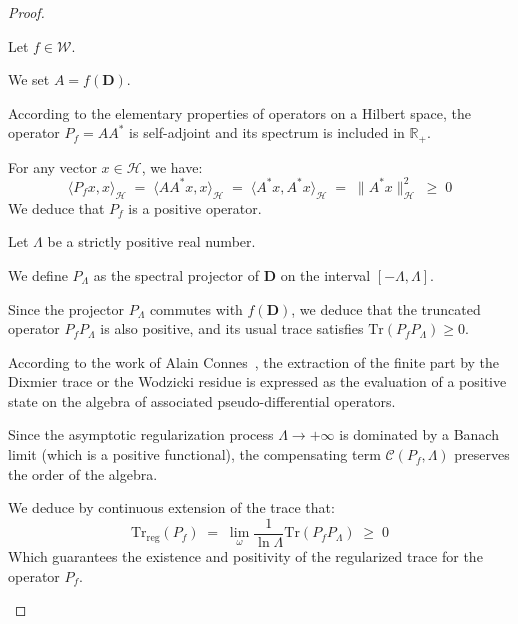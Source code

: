 \documentclass[Riemann_Hypothesis.tex]{subfiles}
\begin{document}
\begin{proof}
    \begin{part_proof}
        Let $f \in \mathcal{W}$. \par
        We set $A = f(\mathbf{D})$. \par
        According to the elementary properties of operators on a Hilbert space, the operator $P_f = A A^*$ is self-adjoint and its spectrum is included in $\mathbb{R}_+$. \par
        For any vector $x \in \mathcal{H}$, we have:
        \begin{equation*}
            \langle P_f x, x \rangle_{\mathcal{H}} \;=\; \langle A A^* x, x \rangle_{\mathcal{H}} \;=\; \langle A^* x, A^* x \rangle_{\mathcal{H}} \;=\; \|A^* x\|_{\mathcal{H}}^2 \;\geq\; 0
        \end{equation*}
        We deduce that $P_f$ is a positive operator. \par
        Let $\Lambda$ be a strictly positive real number. \par
        We define $P_\Lambda$ as the spectral projector of $\mathbf{D}$ on the interval $[-\Lambda, \Lambda]$. \par
        Since the projector $P_\Lambda$ commutes with $f(\mathbf{D})$, we deduce that the truncated operator $P_f P_\Lambda$ is also positive, and its usual trace satisfies $\mathrm{Tr}(P_f P_\Lambda) \geq 0$. \par
        According to the work of Alain Connes~\cite{connes1994_noncommutative_en}, the extraction of the finite part by the Dixmier trace or the Wodzicki residue is expressed as the evaluation of a positive state on the algebra of associated pseudo-differential operators. \par
        Since the asymptotic regularization process $\Lambda \to +\infty$ is dominated by a Banach limit (which is a positive functional), the compensating term $\mathcal{C}(P_f, \Lambda)$ preserves the order of the algebra. \par
        We deduce by continuous extension of the trace that:
        \begin{equation*}
            \mathrm{Tr}_{\mathrm{reg}}(P_f) \;=\; \lim_{\omega} \frac{1}{\ln \Lambda} \mathrm{Tr}(P_f P_\Lambda) \;\geq\; 0
        \end{equation*}
        Which guarantees the existence and positivity of the regularized trace 
        for the operator $P_f$.
    \end{part_proof}
\end{proof}
\end{document}
